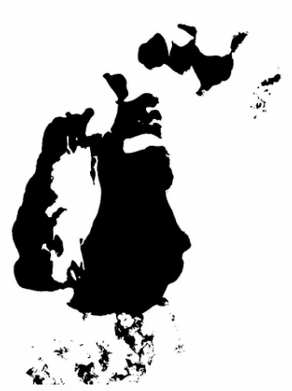 \documentclass[12pt,a4paper]{article}
\begin{document}
\begin{figure}
\begin{subfigure}[b]{0.19\textwidth}
         \includegraphics[width=\textwidth]{../img/1998w.jpg}
         \caption{}
         \label{fig:}
     \end{subfigure}
     \begin{subfigure}[b]{0.19\textwidth}
         \centering

\end{subfigure}
\end{figure}
\end{document}
